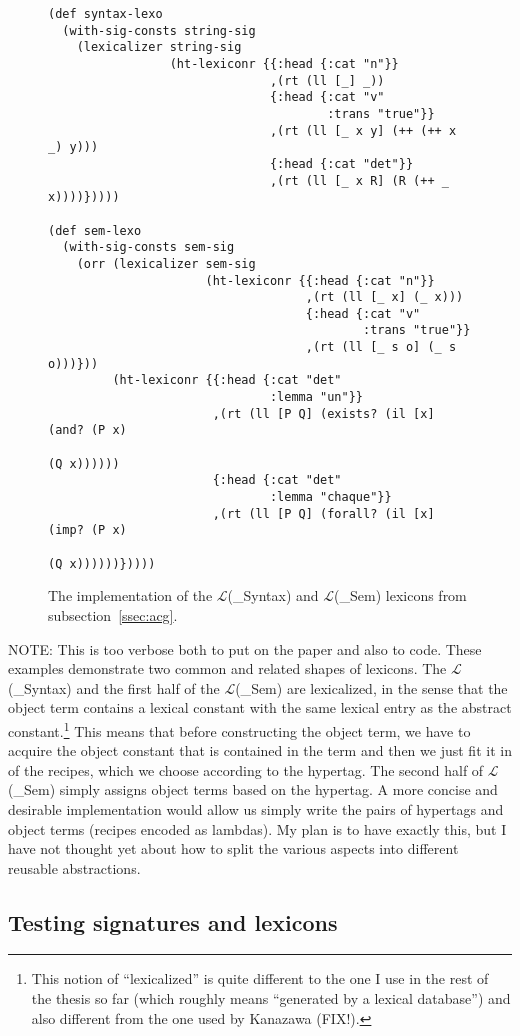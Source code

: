 \begin{figure}
  \centering
\begin{verbatim}
(def syntax-lexo
  (with-sig-consts string-sig
    (lexicalizer string-sig
                 (ht-lexiconr {{:head {:cat "n"}}
                               ,(rt (ll [_] _))
                               {:head {:cat "v"
                                       :trans "true"}}
                               ,(rt (ll [_ x y] (++ (++ x _) y)))
                               {:head {:cat "det"}}
                               ,(rt (ll [_ x R] (R (++ _ x))))}))))

(def sem-lexo
  (with-sig-consts sem-sig
    (orr (lexicalizer sem-sig
                      (ht-lexiconr {{:head {:cat "n"}}
                                    ,(rt (ll [_ x] (_ x)))
                                    {:head {:cat "v"
                                            :trans "true"}}
                                    ,(rt (ll [_ s o] (_ s o)))}))
         (ht-lexiconr {{:head {:cat "det"
                               :lemma "un"}}
                       ,(rt (ll [P Q] (exists? (il [x] (and? (P x)
                                                             (Q x))))))
                       {:head {:cat "det"
                               :lemma "chaque"}}
                       ,(rt (ll [P Q] (forall? (il [x] (imp? (P x)
                                                             (Q x))))))}))))
\end{verbatim}
  \caption{\label{fig:lex-impl} The implementation of the
    $\mathcal{L}$(\_{Syntax}) and $\mathcal{L}$(\_{Sem}) lexicons from
    subsection~\ref{ssec:acg}.}
\end{figure}

 NOTE: This is too verbose both to put on the paper and also to
 code. These examples demonstrate two common and related shapes of
 lexicons. The $\mathcal{L}$(\_{Syntax}) and the first half of the
 $\mathcal{L}$(\_{Sem}) are lexicalized, in the sense that the object
 term contains a lexical constant with the same lexical entry as the
 abstract constant.\footnote{This notion of ``lexicalized'' is quite
   different to the one I use in the rest of the thesis so far (which
   roughly means ``generated by a lexical database'') and also different
   from the one used by Kanazawa (FIX!).} This means that before
 constructing the object term, we have to acquire the object constant
 that is contained in the term and then we just fit it in of the
 recipes, which we choose according to the hypertag. The second half of
 $\mathcal{L}$(\_{Sem}) simply assigns object terms based on the
 hypertag. A more concise and desirable implementation would allow us
 simply write the pairs of hypertags and object terms (recipes encoded
 as lambdas). My plan is to have exactly this, but I have not thought
 yet about how to split the various aspects into different reusable
 abstractions.

\subsection{Testing signatures and lexicons}

